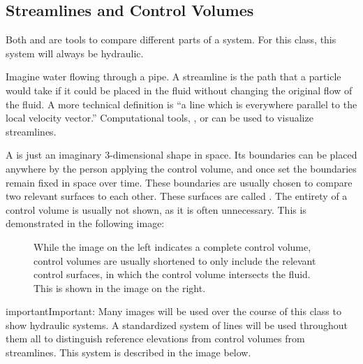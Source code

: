 \documentclass[letterpaper,10pt,english]{sphinxmanual}
\let\sphinxpxdimen\pdfpxdimen\else\newdimen\sphinxpxdimen
\begin{document}
\subsection{Streamlines and Control Volumes}
\label{\detokenize{Fluids_Review/Fluids_Review_Design:streamlines-and-control-volumes}}\label{\detokenize{Fluids_Review/Fluids_Review_Design:id5}}
Both  and  are tools to compare different parts of a system. For this class, this system will always be hydraulic.

Imagine water flowing through a pipe. A streamline is the path that a particle would take if it could be placed in the fluid without changing the original flow of the fluid. A more technical definition is “a line which is everywhere parallel to the local velocity vector.” Computational tools, , or  can be used to visualize streamlines.

A  is just an imaginary 3-dimensional shape in space. Its boundaries can be placed anywhere by the person applying the control volume, and once set the boundaries remain fixed in space over time. These boundaries are usually chosen to compare two relevant surfaces to each other. These surfaces are called . The entirety of a control volume is usually not shown, as it is often unnecessary. This is demonstrated in the following image:

\begin{figure}[htbp]
\centering
\capstart

\noindent\sphinxincludegraphics[width=650\sphinxpxdimen]{{control_volume_simplification}.png}
\caption{While the image on the left indicates a complete control volume, control volumes are usually shortened to only include the relevant control surfaces, in which the control volume intersects the fluid. This is shown in the image on the right.}\label{\detokenize{Fluids_Review/Fluids_Review_Design:id13}}\label{\detokenize{Fluids_Review/Fluids_Review_Design:control-volume-simplification}}\end{figure}

\begin{sphinxadmonition}{important}{Important:}
Many images will be used over the course of this class to show hydraulic systems. A standardized system of lines will be used throughout them all to distinguish reference elevations from control volumes from streamlines. This system is described in the image below.
\end{sphinxadmonition}
\end{document}
